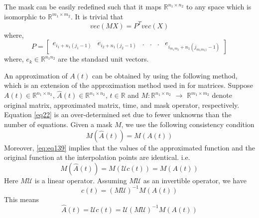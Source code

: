\documentclass{article}
\begin{document}
 The mask can be easily redefined such that it maps $\mathbb{R}^{n_1\times n_2}$ to any space which is isomorphic to $\mathbb{R}^{m_1\times m_2}$. It is trivial that
 \begin{equation}  \label{eq11}
 vec(MX)=P^Tvec(X)
 \end{equation}
 where,
 \begin{equation*} 
 P=\begin{bmatrix}
 e_{i_1+n_1(j_1-1)} & e_{i_2+n_1(j_2-1)} & .&.&.&e_{i_{m_1m_2}+n_1(j_{m_1m_2)}-1)}
 \end{bmatrix}
 \end{equation*}
where, $e_k \in \mathbb{R}^{n_1n_2}$ are the standard unit vectors.

An approximation of $A(t)$ can be obtained by using the following method, which is an extension of the approximation method used in \cite{DEIM} for matrices. Suppose $A(t) \in \mathbb{R}^{n_1 \times n_2}$, $\hat{A}(t) \in \mathbb{R}^{n_1 \times n_2}$, $t \in \mathbb{R}$ and $M: \mathbb{R}^{n_1\times n_2}$ $\rightarrow$ $\mathbb{R}^{m_1\times m_2} $ denote original matrix, approximated matrix, time, and mask operator, respectively. Equation \eqref{eq22} is an over-determined set due to fewer unknowns than the number of equations.  Given a mask $M$, we use the following consistency condition 
\begin{equation}\label{eq:eq139} 
M(\hat{A}(t)) = M(A(t))
\end{equation}
Moreover, \eqref{eq:eq139} implies that the values of the approximated function and the original function at the interpolation points are identical. i.e.
\begin{equation*} 
M(\hat{A}(t)) = M(\mathcal{U}c(t)) = M(A(t))
\end{equation*}
Here $M\mathcal{U}$ is a linear operator. Assuming $M\mathcal{U}$ as an invertible operator, we have
\begin{equation*} 
c(t) = (M\mathcal{U})^{-1}M(A(t))
\end{equation*}
This means
\begin{equation} \label{eq116}
\hat{A}(t) = \mathcal{U}c(t) = \mathcal{U}(M\mathcal{U})^{-1}M(A(t))
\end{equation}
\end{document}

